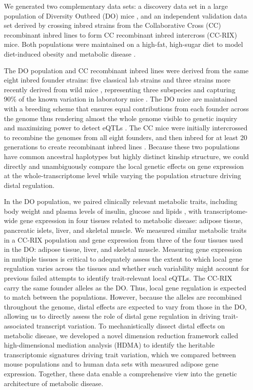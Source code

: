 \documentclass[
]{article}
\begin{document}
We generated two complementary data sets: a discovery data set in a
large population of Diversity Outbred (DO) mice \cite{pmid22892839}, and
an independent validation data set derived by crossing inbred strains
from the Collaborative Cross (CC) recombinant inbred lines
\cite{pmid18716833} to form CC recombinant inbred intercross (CC-RIX)
mice. Both populations were maintained on a high-fat, high-sugar diet to
model diet-induced obesity and metabolic disease \cite{pmid29567659}.

The DO population and CC recombinant inbred lines were derived from the
same eight inbred founder strains: five classical lab strains and three
strains more recently derived from wild mice \cite{pmid22892839},
representing three subspecies and capturing 90\% of the known variation
in laboratory mice \cite{pmid31133439}. The DO mice are maintained with
a breeding scheme that ensures equal contributions from each founder
across the genome thus rendering almost the whole genome visible to
genetic inquiry and maximizing power to detect eQTLs
\cite{pmid22892839}. The CC mice were initially intercrossed to
recombine the genomes from all eight founders, and then inbred for at
least 20 generations to create recombinant inbred lines
\cite{pmid18716833, pmid21411855, 
pmid31133439}. Because these two populations have common ancestral
haplotypes but highly distinct kinship structure, we could directly and
unambiguously compare the local genetic effects on gene expression at
the whole-transcriptome level while varying the population structure
driving distal regulation.

In the DO population, we paired clinically relevant metabolic traits,
including body weight and plasma levels of insulin, glucose and lipids
\cite{pmid29567659}, with transcriptome-wide gene expression in four
tissues related to metabolic disease: adipose tissue, pancreatic islets,
liver, and skeletal muscle. We measured similar metabolic traits in a
CC-RIX population and gene expression from three of the four tissues
used in the DO: adipose tissue, liver, and skeletal muscle. Measuring
gene expression in multiple tissues is critical to adequately assess the
extent to which local gene regulation varies across the tissues and
whether such variability might account for previous failed attempts to
identify trait-relevant local eQTLs. The CC-RIX carry the same founder
alleles as the DO. Thus, local gene regulation is expected to match
between the populations. However, because the alleles are recombined
throughout the genome, distal effects are expected to vary from those in
the DO, allowing us to directly assess the role of distal gene
regulation in driving trait-associated transcript variation. To
mechanistically dissect distal effects on metabolic disease, we
developed a novel dimension reduction framework called high-dimensional
mediation analysis (HDMA) to identify the heritable transcriptomic
signatures driving trait variation, which we compared between mouse
populations and to human data sets with measured adipose gene
expression. Together, these data enable a comprehensive view into the
genetic architecture of metabolic disease.
\end{document}
